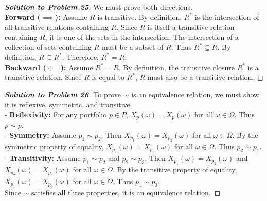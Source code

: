 \documentclass[11pt, a4paper]{article}
\theoremstyle{definition}
\theoremstyle{remark}
\begin{document}
\begin{proof}[\textbf{Solution to Problem 25}]
We must prove both directions. \\
\textbf{Forward ($\implies$):} Assume $R$ is transitive. By definition, $R^*$ is the intersection of all transitive relations containing $R$. Since $R$ is itself a transitive relation containing $R$, it is one of the sets in the intersection. The intersection of a collection of sets containing $R$ must be a subset of $R$. Thus $R^* \subseteq R$. By definition, $R \subseteq R^*$. Therefore, $R^* = R$. \\
\textbf{Backward ($\impliedby$):} Assume $R^* = R$. By definition, the transitive closure $R^*$ is a transitive relation. Since $R$ is equal to $R^*$, $R$ must also be a transitive relation.
\end{proof}

\begin{proof}[\textbf{Solution to Problem 26}]
To prove $\sim$ is an equivalence relation, we must show it is reflexive, symmetric, and transitive. \\
- \textbf{Reflexivity:} For any portfolio $p \in P$, $X_p(\omega) = X_p(\omega)$ for all $\omega \in \Omega$. Thus $p \sim p$. \\
- \textbf{Symmetry:} Assume $p_1 \sim p_2$. Then $X_{p_1}(\omega) = X_{p_2}(\omega)$ for all $\omega \in \Omega$. By the symmetric property of equality, $X_{p_2}(\omega) = X_{p_1}(\omega)$ for all $\omega \in \Omega$. Thus $p_2 \sim p_1$. \\
- \textbf{Transitivity:} Assume $p_1 \sim p_2$ and $p_2 \sim p_3$. Then $X_{p_1}(\omega) = X_{p_2}(\omega)$ and $X_{p_2}(\omega) = X_{p_3}(\omega)$ for all $\omega \in \Omega$. By the transitive property of equality, $X_{p_1}(\omega) = X_{p_3}(\omega)$ for all $\omega \in \Omega$. Thus $p_1 \sim p_3$. \\
Since $\sim$ satisfies all three properties, it is an equivalence relation.
\end{proof}
\end{document}

